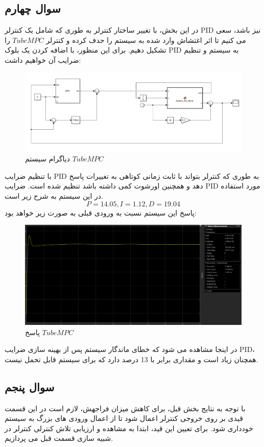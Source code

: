 \subsection*{سوال چهارم}
در این بخش، با تغییر ساختار کنترلر به طوری که شامل یک کنترلر PID نیز باشد، سعی می کنیم تا اثر اغتشاش وارد شده به سیستم را حدف کرده و کنترلر $Tube MPC$ را تشکیل دهیم. برای این منظور، با اضافه کردن یک بلوک PID به سیستم و تنظیم ضرایب آن خواهیم داشت:
\begin{figure}[H]
	\centering
	\includegraphics[width=1\linewidth]{../img/Q1_part4_diagram}
	\caption{دیاگرام سیستم $Tube MPC$}
	\label{fig:q1part4diagram}
\end{figure}
با تنظیم ضرایب PID به طوری که کنترلر بتواند با ثابت زمانی کوتاهی به تغییرات پاسخ دهد و همچنین اورشوت کمی داشته باشد تنظیم شده است.
ضرایب PID مورد استفاده در این سیستم به شرح زیر است.
\[
P = 14.05 , I = 1.12 , D = 19.04
\]
پاسخ این سیستم نسبت به ورودی قبلی به صورت زیر خواهد بود:
\begin{figure}[H]
	\centering
	\includegraphics[width=1\linewidth]{../img/Q1_TubeMPC_Response}
	\caption{پاسخ $Tube MPC$}
	\label{fig:q1tubempcresponse}
\end{figure}
در اینجا مشاهده می شود که خطای ماندگار سیستم پس از بهینه سازی ضرایب PID، همچنان زیاد است و مقداری برابر با 13 درصد دارد که برای سیستم قابل تحمل نیست.
\subsection*{سوال پنجم}
با توجه به نتایج بخش قبل، برای کاهش میزان فراجهش، لازم است در این قسمت قیدی بر روی خروجی کنترلر اعمال شود تا از اعمال ورودی های بزرگ به سیستم خودداری شود. برای تعیین این قید، ابتدا به مشاهده و ارزیابی تلاش کنترلی کنترلر در شبیه سازی قسمت قبل می پردازیم.

